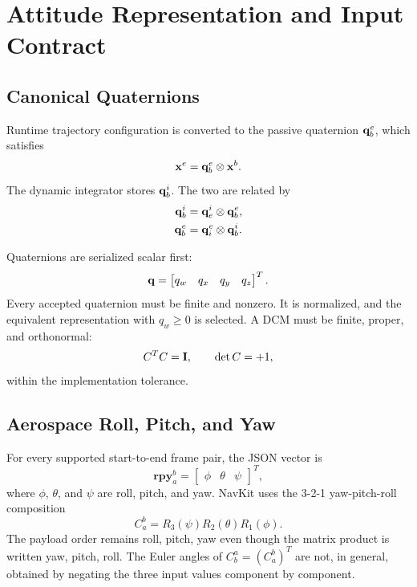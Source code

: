 \chapter{Attitude Representation and Input Contract}

\section{Canonical Quaternions}

Runtime trajectory configuration is converted to the passive quaternion
$\mathbf{q}_b^e$, which satisfies
\begin{equation}
\mathbf{x}^{e}=\mathbf{q}_b^e\otimes\mathbf{x}^{b}.
\label{eq:q_b2e_meaning}
\end{equation}
The dynamic integrator stores $\mathbf{q}_b^i$. The two are related by
\begin{align}
\mathbf{q}_b^i &= \mathbf{q}_e^i\otimes\mathbf{q}_b^e,\\
\mathbf{q}_b^e &= \mathbf{q}_i^e\otimes\mathbf{q}_b^i.
\label{eq:attitude_eci_ecef}
\end{align}

Quaternions are serialized scalar first:
\begin{equation}
\mathbf{q}=
\begin{bmatrix}q_w&q_x&q_y&q_z\end{bmatrix}^{T}.
\end{equation}
Every accepted quaternion must be finite and nonzero. It is normalized, and
the equivalent representation with $q_w\geq 0$ is selected. A DCM must be
finite, proper, and orthonormal:
\begin{equation}
C^{T}C=\mathbf{I},\qquad \det C=+1,
\label{eq:dcm_validity}
\end{equation}
within the implementation tolerance.

\section{Aerospace Roll, Pitch, and Yaw}

For every supported start-to-end frame pair, the JSON vector is
\begin{equation}
\mathbf{rpy}_a^b
=
\begin{bmatrix}\phi&\theta&\psi\end{bmatrix}^{T},
\end{equation}
where $\phi$, $\theta$, and $\psi$ are roll, pitch, and yaw. NavKit uses the
3-2-1 yaw-pitch-roll composition
\begin{equation}
C_a^b
=R_3(\psi)R_2(\theta)R_1(\phi).
\label{eq:rpy_321}
\end{equation}
The payload order remains roll, pitch, yaw even though the matrix product is
written yaw, pitch, roll. The Euler angles of
$C_b^a=\left(C_a^b\right)^{T}$ are not, in
general, obtained by negating the three input values component by component.

